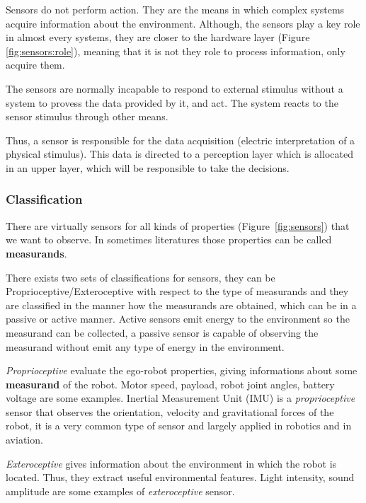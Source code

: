 Sensors do not perform action. They are the means in which complex systems acquire information about the environment. Although, the sensors play a key role in almost every systems, they are closer to the hardware layer (Figure \ref{fig:sensors:role}), meaning that it is not they role to process information, only acquire them. 

The sensors are normally incapable to respond to external stimulus without a system to provess the data provided by it, and act. The system reacts to the sensor stimulus through other means.

Thus, a sensor is responsible for the data acquisition (electric interpretation of a physical stimulus). This data is directed to a perception layer which is allocated in an upper layer, which will be responsible to take the decisions.

\subsubsection{Classification}

There are virtually sensors for all kinds of properties (Figure~\ref{fig:sensors}) that we want to observe. In sometimes literatures those properties can be called \textbf{measurands}\cite{riener2010sensor}. 

There exists two sets of classifications for sensors, they can be Proprioceptive/Exteroceptive with respect to the type of measurands and \cite{iyengar1991autonomous} they are classified in the manner how the measurands are obtained, which can be in a passive or active manner. Active sensors emit energy to the environment so the measurand can be collected, a passive sensor is capable of observing the measurand without emit any type of energy in the environment.

\textit{Proprioceptive} evaluate the ego-robot properties, giving informations about some \textbf{measurand} of the robot. Motor speed, payload, robot joint angles, battery voltage are some examples.  Inertial Measurement Unit (IMU) is a \textit{proprioceptive} sensor that observes the orientation, velocity and gravitational forces of the robot, it is a very common type of sensor and largely applied in robotics and in aviation.

\textit{Exteroceptive} gives information about the environment in which the robot is located. Thus, they extract useful environmental features. Light intensity, sound amplitude are some examples of \textit{exteroceptive} sensor.

